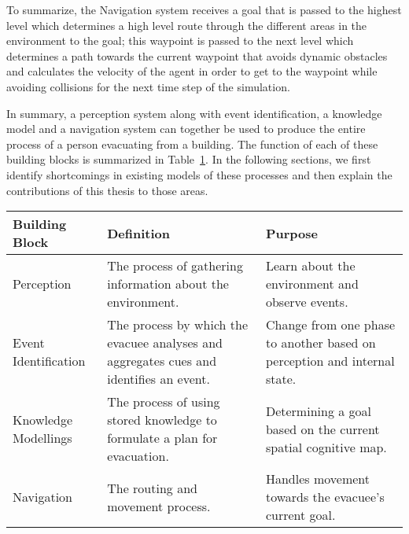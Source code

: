     To summarize, the Navigation system receives a goal that is passed to the highest level which determines a high level route through the different areas in the environment to the goal; this waypoint is passed to the next level which determines a path towards the current waypoint that avoids dynamic obstacles and calculates the velocity of the agent in order to get to the waypoint while avoiding collisions for the next time step of the simulation.




In summary, a perception system along with event identification, a knowledge model and a navigation system can together be used to produce the entire process of a person evacuating from a building. The function of each of these building blocks is summarized in Table~\ref{tab:BuildingBlocks}. In the following sections, we first identify shortcomings in existing models of these processes and then explain the contributions of this thesis to those areas.

\begin{table}[tbp]
\centering
{} %
\begin{tabular}{p{1.0in}   p{2.1in}   p{2.4in}} %
\hline\hline %
Building Block & Definition & Purpose \\
\hline
Perception  & The process of gathering information about the environment. & Learn about the environment and observe events.\\[3pt]
Event Identification & The process by which the evacuee analyses and aggregates cues and identifies an event.  & Change from one phase to another based on perception and internal state.\\[3pt]
Knowledge Modellings & The process of using stored knowledge to formulate a plan for evacuation. & Determining a goal based on the current spatial cognitive map. \\[3pt]
Navigation & The routing and movement process. & Handles movement towards the evacuee's current goal. \\[3pt]
\bottomrule
\end{tabular}
\label{tab:BuildingBlocks}
\end{table}

